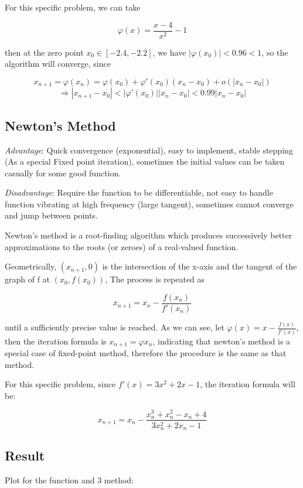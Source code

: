 \documentclass{article}
\begin{document}
For this specific problem, we can take 

$$\varphi(x)=\frac{x-4}{x^2}-1$$

then at the zero point $x_0\in[-2.4,-2.2]$, we have $|\varphi(x_0)|<0.96<1$, so the algorithm will converge, since

$$x_{n+1}=\varphi(x_n)=\varphi(x_0)+\varphi'(x_0)(x_n-x_0)+o(|x_n-x_0|)$$
$$\Rightarrow |x_{n+1}-x_0|<|\varphi'(x_0)||x_n-x_0|<0.99|x_n-x_0|$$

\subsection{Newton's Method}

\emph{Advantage}: Quick convergence (exponential), easy to implement, stable stepping (As a special Fixed point iteration), sometimes the initial values can be taken casually for some good function.

\emph{Disadvantage}: Require the function to be differentiable, not easy to handle function vibrating at high frequency (large tangent), sometimes cannot converge and jump between points.

\sepline

Newton's method is a root-finding algorithm which produces successively better approximations to the roots (or zeroes) of a real-valued function. \cite{newton}

Geometrically, $(x_{n+1}, 0)$ is the intersection of the x-axis and the tangent of the graph of f at $(x_0, f(x_0))$, The process is repeated as

$$\displaystyle x_{n+1}=x_{n}-{\frac {f(x_{n})}{f'(x_{n})}}$$

until a sufficiently precise value is reached. As we can see, let $\displaystyle \varphi(x)=x-\frac{f(x)}{f'(x)}$, then the iteration formula is $x_{n+1}=\varphi{x_n}$, indicating that newton's method is a special case of fixed-point method, therefore the procedure is the same as that method.

For this specific problem, since $f'(x)=3x^2+2x-1$, the iteration formula will be:

$$x_{n+1}=x_n-\frac{x_n^3+x_n^2-x_n+4}{3x_n^2+2x_n-1}$$

\subsection{Result}

Plot for the function and 3 method:
\end{document}
